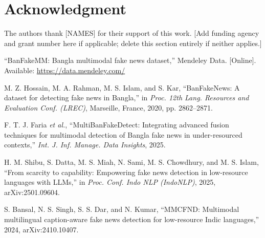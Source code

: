 \documentclass[conference,a4paper]{IEEEtran}
\newif\ifblindsubmission
\newif\ifdraftnotes
\begin{document}
\ifblindsubmission\else
\section*{Acknowledgment}
The authors thank [NAMES] for their support of this work. [Add funding
agency and grant number here if applicable; delete this section entirely if
neither applies.]
\fi

\begin{thebibliography}{00}

 ``BanFakeMM: Bangla multimodal fake news dataset,''
Mendeley Data. [Online]. Available: \url{https://data.mendeley.com/}
\ifdraftnotes\\\emph{\footnotesize [DRAFT NOTE -- REMOVE BEFORE SUBMISSION]
Dataset citation incomplete: no DOI, curator name, or year could be
independently verified from public sources or this project's own repository;
the exact Mendeley record must be supplied before submission.}\fi

 M. Z. Hossain, M. A. Rahman, M. S. Islam, and S. Kar,
``BanFakeNews: A dataset for detecting fake news in Bangla,'' in
\emph{Proc. 12th Lang. Resources and Evaluation Conf. (LREC)}, Marseille,
France, 2020, pp. 2862--2871.

 F. T. J. Faria \emph{et al.},
``MultiBanFakeDetect: Integrating advanced fusion techniques for multimodal
detection of Bangla fake news in under-resourced contexts,''
\emph{Int. J. Inf. Manage. Data Insights}, 2025.

 H. M. Shibu, S. Datta, M. S. Miah, N. Sami,
M. S. Chowdhury, and M. S. Islam, ``From scarcity to capability: Empowering
fake news detection in low-resource languages with LLMs,'' in
\emph{Proc. Conf. Indo NLP (IndoNLP)}, 2025, arXiv:2501.09604.

 S. Bansal, N. S. Singh, S. S. Dar, and N. Kumar,
``MMCFND: Multimodal multilingual caption-aware fake news detection for
low-resource Indic languages,'' 2024, arXiv:2410.10407.


\end{thebibliography}
\end{document}
